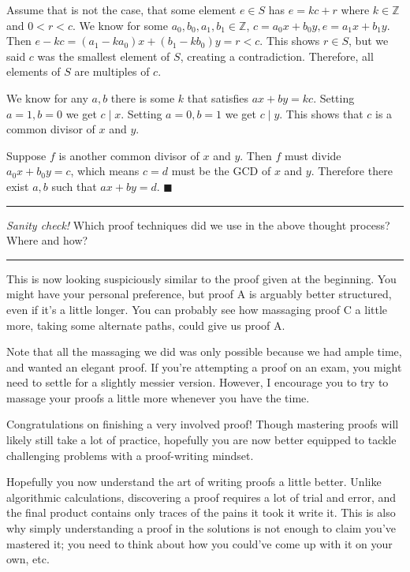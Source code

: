 \documentclass[11pt]{article}
\begin{document}
    Assume that is not the case, that some element $e\in S$ has $e=kc+r$ where
    $k\in\mathbb Z$ and $0<r<c$. We know for some $a_0,b_0,a_1,b_1\in\mathbb Z$,
    $c=a_0x+b_0y,e=a_1x+b_1y$. Then $e-kc=(a_1-ka_0)x+(b_1-kb_0)y=r<c$. This
    shows $r\in S$, but we said $c$ was the smallest element of $S$, creating a 
    contradiction. Therefore, all elements of $S$ are multiples of $c$.
    
    We know for any $a,b$ there is some $k$ that satisfies $ax+by=kc$. Setting
    $a=1,b=0$ we get $c\mid x$. Setting $a=0,b=1$ we get $c\mid y$. This shows that
    $c$ is a common divisor of $x$ and $y$.
    
    Suppose $f$ is another common divisor of $x$ and $y$. Then $f$ must divide
    $a_0x+b_0y=c$, which means $c=d$ must be the GCD of $x$ and $y$. Therefore
    there exist $a,b$ such that $ax+by=d$. $\blacksquare$
    
    \rule{\textwidth}{0.4pt}
    
    \vspace{-5pt}
    \textit{Sanity check!} Which proof techniques did we use in the above thought
    process? Where and how?
    
    \vspace{-10pt}
    \rule{\textwidth}{0.4pt}
    
    This is now looking suspiciously similar to the proof given at the beginning.
    You might have your personal preference, but proof A is arguably better structured,
    even if it's a little longer. You can probably see how massaging proof C a little
    more, taking some alternate paths, could give us proof A.
    
    Note that all the massaging we did was only possible because we had ample time, and
    wanted an elegant proof. If you're attempting a proof on an exam, you might need
    to settle for a slightly messier version. However, I encourage you to try to massage
    your proofs a little more whenever you have the time.
    
    Congratulations on finishing a very involved proof! Though mastering proofs will 
    likely still take a lot of practice, hopefully you are now better equipped to tackle
    challenging problems with a proof-writing mindset.
    

    Hopefully you now understand the art of writing proofs a little better. Unlike 
    algorithmic calculations, discovering a proof requires a lot of trial and error,
    and the final product contains only traces of the pains it took it write it. This
    is also why simply understanding a proof in the solutions is not enough to claim
    you've mastered it; you need to think about how you could've come up with it on
    your own, etc.
    
\end{document}

